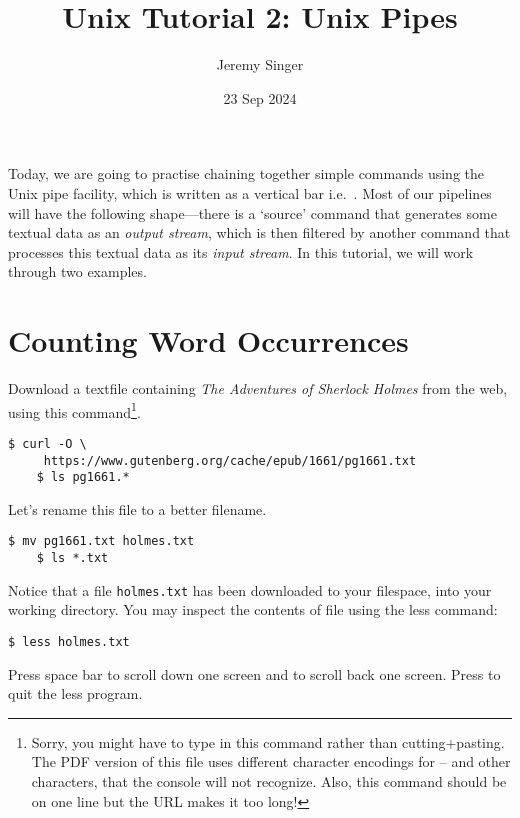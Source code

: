 \documentclass{article}
\begin{document}
\title{Unix Tutorial 2: Unix Pipes}
\author{Jeremy Singer}
\date{23 Sep 2024}
\maketitle
  



Today, we are going to practise chaining together simple commands using the Unix pipe facility, which is written as a vertical bar i.e.\ \textbar.
Most of our pipelines will have the following shape---there is a `source' command that generates some textual data as an \textit{output stream}, which is then filtered by another command that processes this textual data as its \textit{input stream}. In this tutorial, we will work through two examples.

\section*{Counting Word Occurrences}

Download a textfile containing \textit{The Adventures of Sherlock Holmes} from the web, using this command\footnote{Sorry, you might have to type in this command rather than cutting+pasting. The PDF version of this file uses different character encodings for -- and other characters, that the console will not recognize. Also, this command should be on one line but the URL makes it too long!}.
\begin{lstlisting}[style=BashInputStyle]
    $ curl -O \
     https://www.gutenberg.org/cache/epub/1661/pg1661.txt
    $ ls pg1661.*
\end{lstlisting}
Let's rename this file to a better filename.

\begin{lstlisting}[style=BashInputStyle]
    $ mv pg1661.txt holmes.txt
    $ ls *.txt
\end{lstlisting}


Notice that a file \texttt{holmes.txt} has been downloaded to your filespace, into your working directory. You may inspect the contents of file using the less command:

\begin{lstlisting}[style=BashInputStyle]
    $ less holmes.txt
\end{lstlisting}

Press space bar to scroll down one screen and  to scroll back one screen. Press  to quit the less program.
\end{document}
